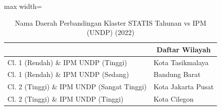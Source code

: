 \begin{table}[H]
\centering
\caption{Nama Daerah Perbandingan Klaster STATIS Tahunan vs IPM (UNDP) (2022)} \label{tab:sample2statis_ipm_name_2022}
\begin{adjustbox}{max width=\textwidth}
\begin{tabular}{|>{\centering\arraybackslash}p{4cm}|p{10cm}|}
\hline
\multicolumn{1}{|c|}{\textbf{Kategori}} & \multicolumn{1}{c|}{\textbf{Daftar Wilayah}} \\
\hline
Cl. 1 (Rendah) \& IPM UNDP (Tinggi) & Kota Tasikmalaya \\
\hline
Cl. 1 (Rendah) \& IPM UNDP (Sedang) & Bandung Barat \\
\hline
Cl. 2 (Tinggi) \& IPM UNDP (Sangat Tinggi) & Kota Jakarta Pusat \\
\hline
Cl. 2 (Tinggi) \& IPM UNDP (Tinggi) & Kota Cilegon \\
\hline
\end{tabular}
\end{adjustbox}
\end{table}